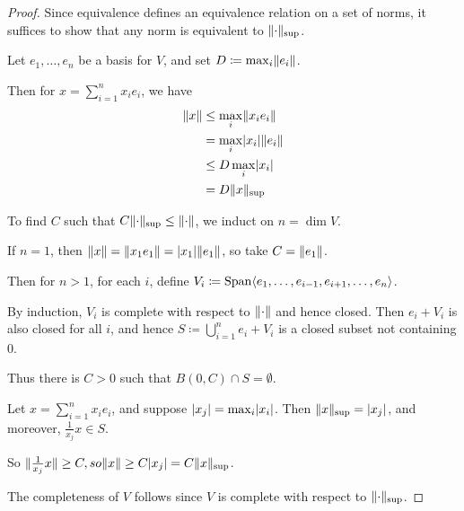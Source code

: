 \documentclass[10pt,a4paper]{article}
\begin{document}
\begin{proof}
  Since equivalence defines an equivalence relation on a set of norms, it suffices to show that any norm is equivalent to $\lVert\cdot\rVert_{\sup}$.

  Let $e_1, \ldots, e_n$ be a basis for $V$, and set $D \coloneqq \max_i \lVert e_i\rVert$.

  Then for $x = \sum_{i=1}^n x_i e_i$, we have
  \begin{align*}
    \lVert x\rVert &\leq \max_i \lVert x_ie_i\rVert\\
    &= \max_i \lvert x_i\rvert\lVert e_i\rVert\\
    & \leq D\max_i \lvert x_i\rvert\\
    &=D\lVert x\rVert_{\sup}
  \end{align*}

  To find $C$ such that $C \lVert\cdot\rVert_{\sup} \leq \lVert\cdot\rVert$, we induct on $n =\dim V$.

  If $n = 1$, then $\lVert x\rVert = \lVert x_1 e_1\rVert = \lvert x_1\rvert\lVert e_1\rVert$, so take $C = \lVert e_1\rVert$.

  Then for $n >1$, for each $i$, define $V_i \coloneqq \operatorname{Span} \langle e_1, \ldots, e_{i-1}, e_{i+1}, \ldots, e_n \rangle$.

  By induction, $V_i$ is complete with respect to $\lVert\cdot\rVert$ and hence closed. Then $e_i + V_i$ is also closed for all $i$, and hence $S \coloneqq \bigcup\limits_{i=1}^n e_i + V_i$ is a closed subset not containing 0.

  Thus there is $C > 0$ such that $B(0, C)\cap S = \emptyset$.

  Let $x = \sum_{i=1}^n x_i e_i$, and suppose $\lvert x_j\rvert = \max_i \lvert x_i\rvert$. Then $\lVert x\rVert_{\sup} = \lvert x_j\rvert$, and moreover, $\frac{1}{x_j}x \in S$.

  So $\lVert\frac{1}{x_j}x\rVert\geq C, so \lVert x\rVert\geq C\lvert x_j\rvert = C \lVert x\rVert_{\sup}$.

  The completeness of $V$ follows since $V$ is complete with respect to $\lVert\cdot\rVert_{\sup}$.
\end{proof}
\end{document}
